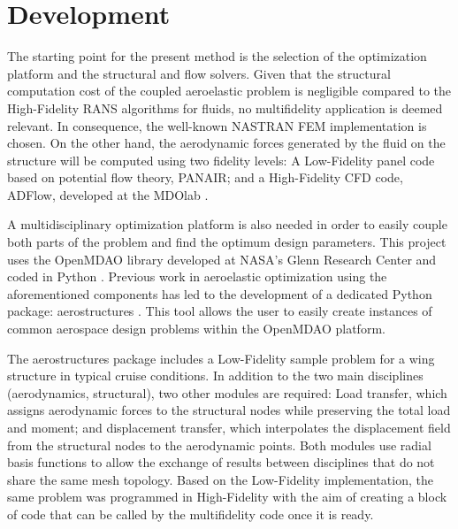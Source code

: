 \section{Development}
\label{sec:development}
The starting point for the present method is the selection of the optimization platform and the structural and flow solvers. Given that the structural computation cost of the coupled aeroelastic problem is negligible compared to the High-Fidelity RANS algorithms for fluids, no multifidelity application is deemed relevant. In consequence, the well-known NASTRAN FEM implementation is chosen. On the other hand, the aerodynamic forces generated by the fluid on the structure will be computed using two fidelity levels: A Low-Fidelity panel code based on potential flow theory, PANAIR; and a High-Fidelity CFD code, ADFlow, developed at the MDOlab \cite{lyu2013automatic}. \par
A multidisciplinary optimization platform is also needed in order to easily couple both parts of the problem and find the optimum design parameters. This project uses the OpenMDAO library developed at NASA's Glenn Research Center and coded in Python \cite{openmdao_2019}. Previous work in aeroelastic optimization using the aforementioned components has led to the development of a dedicated Python package: aerostructures \cite{mascolomer:tel-02023612}. This tool allows the user to easily create instances of common aerospace design problems within the OpenMDAO platform.\par
The aerostructures package includes a Low-Fidelity sample problem for a wing structure in typical cruise conditions. In addition to the two main disciplines (aerodynamics, structural), two other modules are required:
Load transfer, which assigns aerodynamic forces to the structural nodes while preserving the total load and moment; and displacement transfer, which interpolates the displacement field from the structural nodes to the aerodynamic points. Both modules use radial basis functions to allow the exchange of results between disciplines that do not share the same mesh topology. Based on the Low-Fidelity implementation, the same problem was programmed in High-Fidelity with the aim of creating a block of code that can be called by the multifidelity code once it is ready. 


